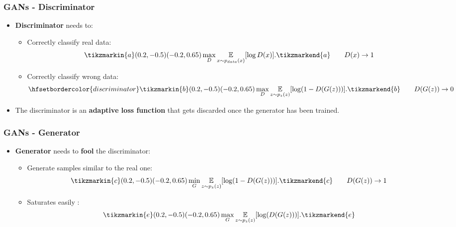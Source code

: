 \documentclass{beamer}
\begin{document}
\begin{frame}
	\frametitle{GANs - Discriminator}
	\begin{itemize}
			\item \textbf{Discriminator} needs to:
			\begin{itemize}
				\item Correctly classify \textcolor{real}{real} data: \\ 
					\begin{equation}
						\tikzmarkin{a}(0.2,-0.5)(-0.2,0.65)
							\max_D \underset{x \sim p_{data}(x)}{\mathbb{E}} [\log D(x)].
						\tikzmarkend{a}
						\tag*{$D(x) \rightarrow 1$}
					\end{equation}
				\item Correctly classify \textcolor{generated}{wrong} data: \\ 
					 \begin{equation}
						\hfsetbordercolor{discriminator} \tikzmarkin{b}(0.2,-0.5)(-0.2,0.65)
							\max_D  \underset{z \sim p_z(z)}{\mathbb{E}}[\log(1 - D(G(z)))].
						\tikzmarkend{b}
						\tag*{$D(G(z)) \rightarrow 0$}
					 \end{equation}
		\end{itemize}
	\item The discriminator is an \textbf{adaptive loss function} that gets discarded once the generator has been trained.
	\end{itemize}
\end{frame}

\begin{frame}
	\frametitle{GANs - Generator}
	\begin{itemize}
		\item \textbf{Generator} needs to \textbf{fool} the discriminator:
		\begin{itemize}	
			\item<1-> \alert<+>{Generate samples similar to the real one:
			\begin{equation}
				\tikzmarkin{c}(0.2,-0.5)(-0.2,0.65)
				\min_G  \underset{z \sim p_z(z)}{\mathbb{E}}[\log(1 - D(G(z)))].
				\tikzmarkend{c}
				\tag*{$D(G(z)) \rightarrow 1$}
			\end{equation}}
				\item<2-> \alert<+>{Saturates easily \citep{goodfellowGenerativeAdversarialNetworks2014}:
					\begin{equation}
					\tikzmarkin{e}(0.2,-0.5)(-0.2,0.65)
					\max_G  \underset{z \sim p_z(z)}{\mathbb{E}}[\log( D(G(z)))].
					\tikzmarkend{e}
				\end{equation}
				}
		\end{itemize}
	\end{itemize}
\end{frame}
\end{document}
